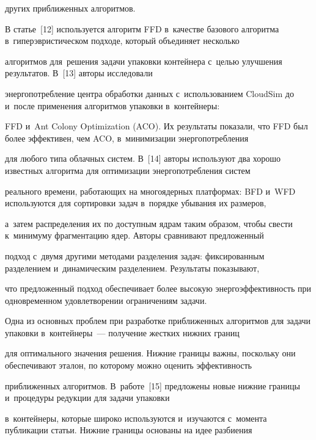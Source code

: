 других при\-бли\-жен\-ных алгоритмов.

{



}



В статье~[12] используется алгоритм FFD в~качестве базового алгоритма в~гиперэвристическом подходе, который объединяет несколько 

алгоритмов для~решения задачи упа\-ков\-ки контейнера с~\mbox{целью} улуч\-ше\-ния результатов. В~[13] авторы исследовали 

энергопотребление цент\-ра обработки данных с~использованием \mbox{CloudSim} до и~после применения алгоритмов упаковки в~контейнеры: 

FFD и~Ant Colony Optimization (ACO). Их результаты показали, что FFD был более эффективен, чем ACO, в~минимизации энергопотребления 

для любого типа облачных сис\-тем. В~[14] авторы используют два хорошо известных алгоритма для оптимизации энергопотребления сис\-тем 

реального времени, работающих на многоядерных платформах: BFD и~WFD используются для сор\-ти\-ров\-ки задач в~порядке убывания их размеров, 

а~затем распределения их по до\-ступ\-ным яд\-рам таким образом, чтобы свес\-ти к~минимуму фрагментацию ядер. Авторы сравнивают предложенный 

подход с~двумя другими методами разделения задач: фиксированным разделением и~динамическим разделением. Результаты показывают, 

что предложенный подход обеспечивает более высокую энер\-го\-эф\-фек\-тив\-ность при одновременном удовле\-тво\-ре\-нии ограничениям за\-дачи.

{



}





Одна из основных проб\-лем при разработке приближенных алгоритмов для задачи упа\-ков\-ки в~контейнеры~--- получение жест\-ких ниж\-них границ 

для оптимального значения решения. Нижние границы важны, поскольку они обеспечивают эталон, по которому мож\-но оценить эф\-фек\-тив\-ность 

при\-бли\-жен\-ных алгоритмов. В~работе~[15] предложены новые ниж\-ние границы и~процедуры редукции для задачи упаковки 

в~контейнеры, которые широко используются и~изучаются с~момента пуб\-ли\-ка\-ции статьи. Ниж\-ние границы основаны на идее раз\-би\-е\-ния 

